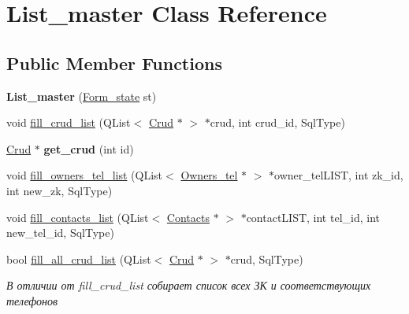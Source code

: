 \hypertarget{class_list__master}{}\section{List\+\_\+master Class Reference}
\label{class_list__master}
\subsection*{Public Member Functions}
\begin{DoxyCompactItemize}
\item 
\mbox{\label{class_list__master_afdab019c75a0a1383328a280d4429445}} 
{\bfseries List\+\_\+master} (\mbox{\hyperlink{list__master_8h_a548aac42619455ceeca53d1f4fcb446d}{Form\+\_\+state}} st)
\item 
void \mbox{\hyperlink{class_list__master_a548dab388e4d2c705242c316617b1271}{fill\+\_\+crud\+\_\+list}} (Q\+List$<$ \mbox{\hyperlink{class_crud}{Crud}} $\ast$ $>$ $\ast$crud, int crud\+\_\+id, Sql\+Type)
\item 
\mbox{\label{class_list__master_aa51a8842fead3f521d339fb8534f4afc}} 
\mbox{\hyperlink{class_crud}{Crud}} $\ast$ {\bfseries get\+\_\+crud} (int id)
\item 
void \mbox{\hyperlink{class_list__master_a57d25edc739caf7fd551b857c5a9cb78}{fill\+\_\+owners\+\_\+tel\+\_\+list}} (Q\+List$<$ \mbox{\hyperlink{class_owners__tel}{Owners\+\_\+tel}} $\ast$ $>$ $\ast$owner\+\_\+tel\+L\+I\+ST, int zk\+\_\+id, int new\+\_\+zk, Sql\+Type)
\item 
void \mbox{\hyperlink{class_list__master_aa22bf9a416c88c5e3abb803a43392c1b}{fill\+\_\+contacts\+\_\+list}} (Q\+List$<$ \mbox{\hyperlink{class_contacts}{Contacts}} $\ast$ $>$ $\ast$contact\+L\+I\+ST, int tel\+\_\+id, int new\+\_\+tel\+\_\+id, Sql\+Type)
\item 
\mbox{\label{class_list__master_aa95693474311b2c102563a9ef4e5e365}} 
bool \mbox{\hyperlink{class_list__master_aa95693474311b2c102563a9ef4e5e365}{fill\+\_\+all\+\_\+crud\+\_\+list}} (Q\+List$<$ \mbox{\hyperlink{class_crud}{Crud}} $\ast$ $>$ $\ast$crud, Sql\+Type)
\begin{DoxyCompactList}\small\item\em В отличии от fill\+\_\+crud\+\_\+list собирает список всех ЗК и соответствующих телефонов \end{DoxyCompactList}\item 

\end{DoxyCompactItemize}
